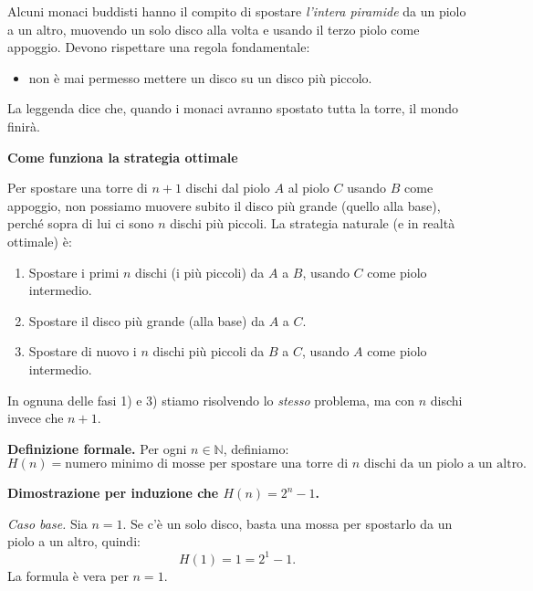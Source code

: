 \begin{esempio}
Alcuni monaci buddisti hanno il compito di spostare \emph{l’intera piramide} da un piolo
a un altro, muovendo un solo disco alla volta e usando il terzo piolo come appoggio.
Devono rispettare una regola fondamentale:
\begin{itemize}
    \item non è mai permesso mettere un disco su un disco più piccolo.
\end{itemize}
La leggenda dice che, quando i monaci avranno spostato tutta la torre, il mondo finirà.

\medskip
\textbf{Come funziona la strategia ottimale}

Per spostare una torre di \(n+1\) dischi dal piolo \(A\) al piolo \(C\) usando \(B\) come appoggio,
non possiamo muovere subito il disco più grande (quello alla base), perché sopra di lui
ci sono \(n\) dischi più piccoli. La strategia naturale (e in realtà ottimale) è:

\begin{enumerate}
    \item Spostare i primi \(n\) dischi (i più piccoli) da \(A\) a \(B\), usando \(C\) come piolo intermedio.
    \item Spostare il disco più grande (alla base) da \(A\) a \(C\).
    \item Spostare di nuovo i \(n\) dischi più piccoli da \(B\) a \(C\), usando \(A\) come piolo intermedio.
\end{enumerate}

In ognuna delle fasi 1) e 3) stiamo risolvendo lo \emph{stesso} problema, ma con \(n\) dischi
invece che \(n+1\).

\medskip
\textbf{Definizione formale.}
Per ogni \(n \in \mathbb{N}\), definiamo:
\[
H(n) = \text{numero minimo di mosse per spostare una torre di \(n\) dischi da un piolo a un altro.}
\]

\medskip
\textbf{Dimostrazione per induzione che \(H(n)=2^n-1\).}

\textit{Caso base.} Sia \(n = 1\). Se c’è un solo disco, basta una mossa per
spostarlo da un piolo a un altro, quindi:
\[
H(1) = 1 = 2^1 - 1.
\]
La formula è vera per \(n=1\).


\end{esempio}
